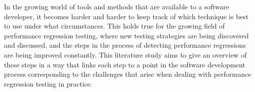 In the growing world of tools and methods that are available to a software developer, it becomes harder and harder to keep track of which technique is best to use under what circumstances. This holds true for the growing field of performance regression testing, where new testing strategies are being discovered and discussed, and the steps in the process of detecting performance regressions are being improved constantly. This literature study aims to give an overview of these steps in a way that links each step to a point in the software development process corresponding to the challenges that arise when dealing with performance regression testing in practice.
